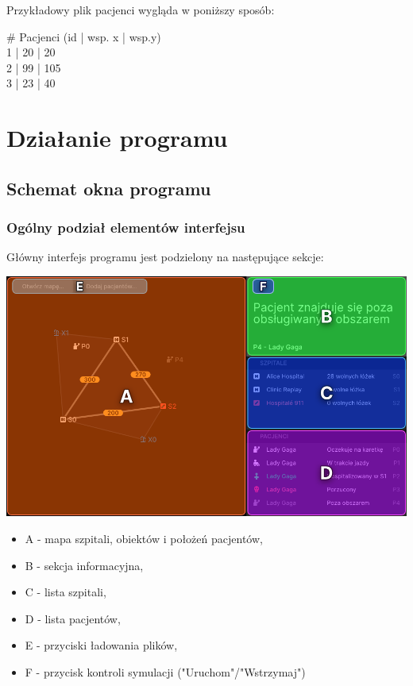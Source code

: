 \documentclass{article}
\begin{document}
 \vspace{0.5cm}
Przykładowy plik pacjenci wygląda w poniższy sposób:
 \vspace{0.8cm}
 
\# Pacjenci (id | wsp. x | wsp.y)\\
1 | 20 | 20\\
2 | 99 | 105\\
3 | 23 | 40\\

\pagebreak
\section{Działanie programu}

\subsection{Schemat okna programu}

\subsubsection{Ogólny podział elementów interfejsu}
Główny interfejs programu jest podzielony na następujące sekcje: \\

 \vspace{0.5cm}
 
\centerline{\includegraphics[scale=0.3]{images/areas.png}}

 \vspace{0.7cm}
 
\begin{itemize}
    \item A - mapa szpitali, obiektów i położeń pacjentów,
    \item B - sekcja informacyjna,
    \item C - lista szpitali,
    \item D - lista pacjentów,
    \item E - przyciski ładowania plików,
    \item F - przycisk kontroli symulacji ("Uruchom"/"Wstrzymaj")
\end{itemize}
\end{document}
